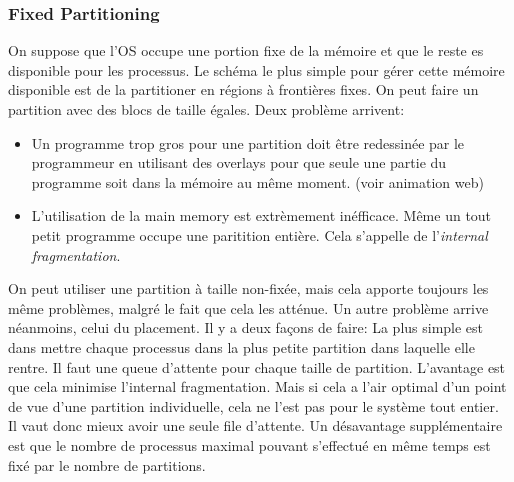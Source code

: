 \subsubsection{Fixed Partitioning}
On suppose que l'OS occupe une portion fixe de la mémoire et que le reste es disponible pour les processus.
Le schéma le plus simple pour gérer cette mémoire disponible est de la partitioner en régions à frontières fixes.
On peut faire un partition avec des blocs de taille égales.
Deux problème arrivent:
\begin{itemize}
  \item Un programme trop gros pour une partition doit être redessinée par le programmeur en utilisant des overlays
    pour que seule une partie du programme soit dans la mémoire au même moment.
    (voir animation web)
  \item L'utilisation de la main memory est extrèmement inéfficace.
    Même un tout petit programme occupe une paritition entière.
    Cela s'appelle de l'\emph{internal fragmentation}.
\end{itemize}

On peut utiliser une partition à taille non-fixée, mais cela apporte toujours les même problèmes, malgré le fait que cela les atténue.
Un autre problème arrive néanmoins, celui du placement.
Il y a deux façons de faire: La plus simple est dans mettre chaque processus dans la plus petite partition dans laquelle elle rentre.
Il faut une queue d'attente pour chaque taille de partition.
L'avantage est que cela minimise l'internal fragmentation.
Mais si cela a l'air optimal d'un point de vue d'une partition individuelle, cela ne l'est pas pour le système tout entier.
Il vaut donc mieux avoir une seule file d'attente.
Un désavantage supplémentaire est que le nombre de processus maximal pouvant s'effectué en même temps est fixé par le nombre de partitions.

